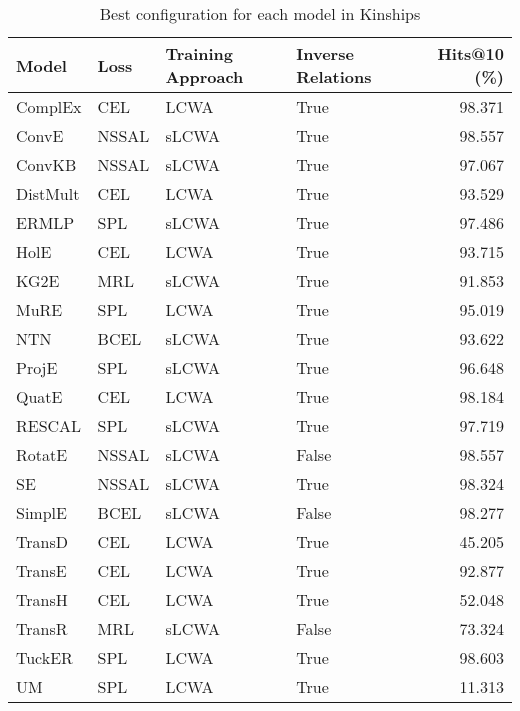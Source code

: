 \begin{table}
\centering
\caption{Best configuration for each model in Kinships}
\label{best_models_kinships}
\begin{tabular}{llllr}
\toprule
   Model &  Loss & Training Approach & Inverse Relations &  Hits@10 (\%) \\
\midrule
 ComplEx &   CEL &              LCWA &              True &       98.371 \\
   ConvE & NSSAL &             sLCWA &              True &       98.557 \\
  ConvKB & NSSAL &             sLCWA &              True &       97.067 \\
DistMult &   CEL &              LCWA &              True &       93.529 \\
   ERMLP &   SPL &             sLCWA &              True &       97.486 \\
    HolE &   CEL &              LCWA &              True &       93.715 \\
    KG2E &   MRL &             sLCWA &              True &       91.853 \\
    MuRE &   SPL &              LCWA &              True &       95.019 \\
     NTN &  BCEL &             sLCWA &              True &       93.622 \\
   ProjE &   SPL &             sLCWA &              True &       96.648 \\
   QuatE &   CEL &              LCWA &              True &       98.184 \\
  RESCAL &   SPL &             sLCWA &              True &       97.719 \\
  RotatE & NSSAL &             sLCWA &             False &       98.557 \\
      SE & NSSAL &             sLCWA &              True &       98.324 \\
  SimplE &  BCEL &             sLCWA &             False &       98.277 \\
  TransD &   CEL &              LCWA &              True &       45.205 \\
  TransE &   CEL &              LCWA &              True &       92.877 \\
  TransH &   CEL &              LCWA &              True &       52.048 \\
  TransR &   MRL &             sLCWA &             False &       73.324 \\
  TuckER &   SPL &              LCWA &              True &       98.603 \\
      UM &   SPL &              LCWA &              True &       11.313 \\
\bottomrule
\end{tabular}
\end{table}

